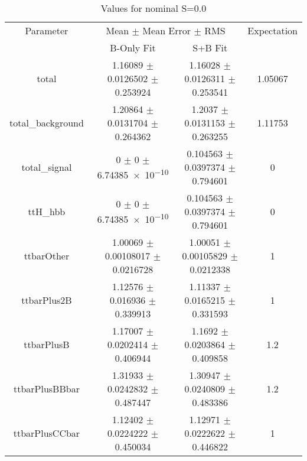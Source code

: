 \begin{table}
\centering
\caption{Values for nominal S=0.0}
\begin{tabular}{cccc}
\toprule
Parameter & \multicolumn{2}{c}{Mean $\pm$ Mean Error $\pm$ RMS} & Expectation\\
 & B-Only Fit & S+B Fit & \\
\midrule
total & \num{1.16089} $\pm$ \num{0.0126502} $\pm$ \num{0.253924} & \num{1.16028} $\pm$ \num{0.0126311} $\pm$ \num{0.253541} & \num{1.05067}\\
total\_background & \num{1.20864} $\pm$ \num{0.0131704} $\pm$ \num{0.264362} & \num{1.2037} $\pm$ \num{0.0131153} $\pm$ \num{0.263255} & \num{1.11753}\\
total\_signal & \num{0} $\pm$ \num{0} $\pm$ \num{6.74385e-10} & \num{0.104563} $\pm$ \num{0.0397374} $\pm$ \num{0.794601} & \num{0}\\
ttH\_hbb & \num{0} $\pm$ \num{0} $\pm$ \num{6.74385e-10} & \num{0.104563} $\pm$ \num{0.0397374} $\pm$ \num{0.794601} & \num{0}\\
ttbarOther & \num{1.00069} $\pm$ \num{0.00108017} $\pm$ \num{0.0216728} & \num{1.00051} $\pm$ \num{0.00105829} $\pm$ \num{0.0212338} & \num{1}\\
ttbarPlus2B & \num{1.12576} $\pm$ \num{0.016936} $\pm$ \num{0.339913} & \num{1.11337} $\pm$ \num{0.0165215} $\pm$ \num{0.331593} & \num{1}\\
ttbarPlusB & \num{1.17007} $\pm$ \num{0.0202414} $\pm$ \num{0.406944} & \num{1.1692} $\pm$ \num{0.0203864} $\pm$ \num{0.409858} & \num{1.2}\\
ttbarPlusBBbar & \num{1.31933} $\pm$ \num{0.0242832} $\pm$ \num{0.487447} & \num{1.30947} $\pm$ \num{0.0240809} $\pm$ \num{0.483386} & \num{1.2}\\
ttbarPlusCCbar & \num{1.12402} $\pm$ \num{0.0224222} $\pm$ \num{0.450034} & \num{1.12971} $\pm$ \num{0.0222622} $\pm$ \num{0.446822} & \num{1}\\
\bottomrule
\end{tabular}
\end{table}